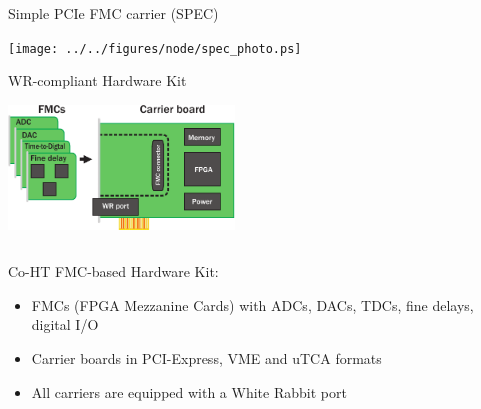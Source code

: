 \documentclass[compress,red]{beamer}
\begin{document}
\begin{frame}{Simple PCIe FMC carrier (SPEC)}

    \begin{center}
    \texttt{[image: ../../figures/node/spec\_photo.ps]}
    \end{center}


\end{frame}
\begin{frame}{WR-compliant Hardware Kit}

    \begin{center}
    \includegraphics[width=6cm]{../../figures/node/shw_kit}
    \end{center}

  \begin{columns}[c]

	\begin{block}{Co-HT FMC-based Hardware Kit:}
	  \begin{itemize}
	  \item FMCs (FPGA Mezzanine Cards) with ADCs, DACs, TDCs, fine delays, digital I/O
	  \item Carrier boards in PCI-Express, VME and uTCA formats
	  \item All carriers are equipped with a White Rabbit port
	  \end{itemize}
	\end{block}

  \end{columns}


\end{frame}
\end{document}
